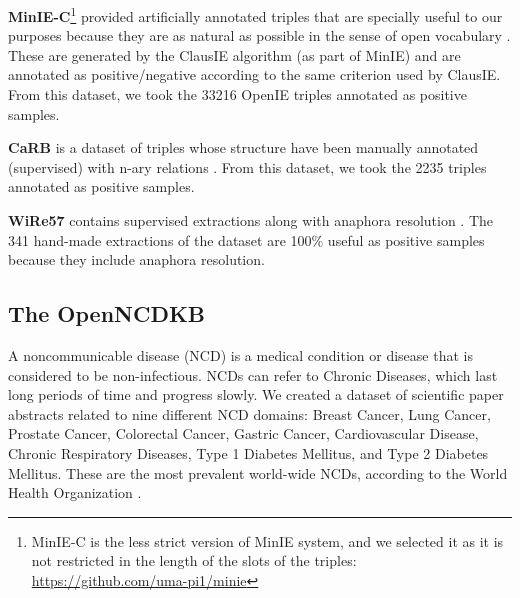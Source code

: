 \documentclass[preprint]{elsarticle}
\begin{document}
\textbf{MinIE-C}\footnote{MinIE-C is the less strict version of MinIE system, and we selected it as it is not restricted in the length of the slots of the triples: \url{https://github.com/uma-pi1/minie}} provided artificially annotated triples that are specially useful to our purposes because they are as natural as possible in the sense of open vocabulary \cite{gashteovski-etal-2017-minie}. These are generated by the ClausIE algorithm (as part of MinIE) and are annotated as positive/negative according to the same criterion used by ClausIE. From this dataset, we took the 33216 OpenIE triples annotated as positive samples. 

\textbf{CaRB} is a dataset of triples whose structure have been manually annotated (supervised) with n-ary relations \cite{bhardwaj-etal-2019-carb}. From this dataset, we took the 2235 triples annotated as positive samples. 

\textbf{WiRe57} contains supervised extractions along with anaphora resolution \cite{lechelle-etal-2019-wire57}. The 341 hand-made extractions of the dataset are 100\% useful as positive samples because they include anaphora resolution.


\subsection{The OpenNCDKB}\label{sec:open_ncd_kb_data}
A noncommunicable disease (NCD) is a medical condition or disease that is considered to be non-infectious. NCDs can refer to Chronic Diseases, which last long periods of time and progress slowly. We created a dataset of scientific paper abstracts related to nine different NCD domains: Breast Cancer, Lung Cancer, Prostate Cancer, Colorectal Cancer, Gastric Cancer, Cardiovascular Disease, Chronic Respiratory Diseases, Type 1 Diabetes Mellitus, and Type 2 Diabetes Mellitus. These are the most prevalent world-wide NCDs, according to the World Health Organization \cite{world2018noncommunicable}.
\end{document}
